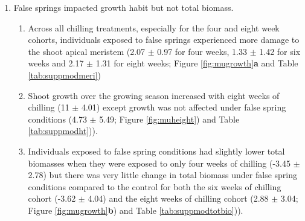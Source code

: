 \documentclass{article}\usepackage[]{graphicx}\usepackage[]{color}
\begin{document}
\begin{enumerate}
\item False springs impacted growth habit but not total biomass.
  \begin{enumerate}
  \item Across all chilling treatments, especially for the four and eight week cohorts, individuals exposed to false springs experienced more damage to the shoot apical meristem (2.07 $\pm$ 0.97 for four weeks, 1.33 $\pm$ 1.42 for six weeks and 2.17 $\pm$ 1.31 for eight weeks; Figure \ref{fig:mugrowth}\textbf{a} and Table \ref{tab:suppmodmeri}) 
  \item Shoot growth over the growing season increased with eight weeks of chilling (11 $\pm$ 4.01) except growth was not affected under false spring conditions (4.73 $\pm$ 5.49; Figure \ref{fig:muheight}) and Table \ref{tab:suppmodht})).
  \item Individuals exposed to false spring conditions had slightly lower total biomasses when they were exposed to only four weeks of chilling (-3.45 $\pm$ 2.78) but there was very little change in total biomass under false spring conditions compared to the control for both the six weeks of chilling cohort (-3.62 $\pm$ 4.04) and the eight weeks of chilling cohort (2.88 $\pm$ 3.04; Figure \ref{fig:mugrowth}\textbf{b}) and Table \ref{tab:suppmodtotbio})).
  \end{enumerate}
  

\end{enumerate}
\end{document}
